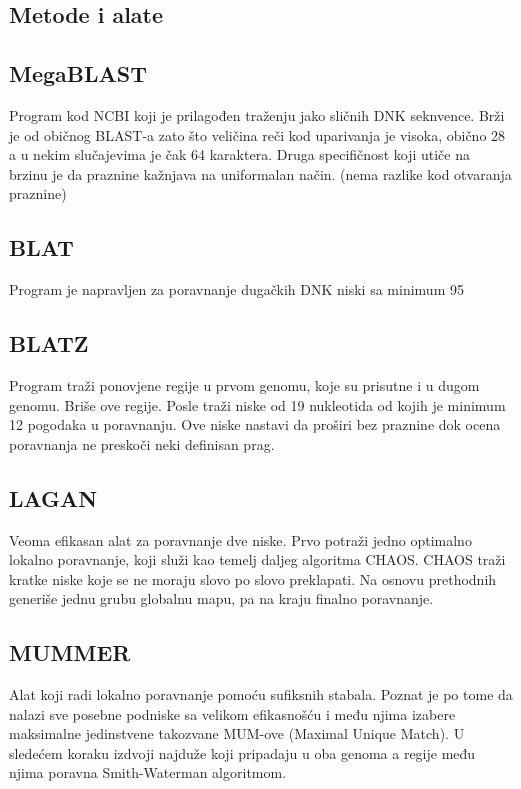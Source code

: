\subsection{Metode i alate}

\subsection{MegaBLAST}
Program kod NCBI koji je prilagođen traženju jako sličnih DNK seknvence. Brži je od običnog BLAST-a zato što veličina reči kod uparivanja je visoka, obično 28 a u nekim slučajevima je čak 64 karaktera. Druga specifičnost koji utiče na brzinu je da praznine kažnjava na uniformalan način. (nema razlike kod otvaranja praznine)

\subsection{BLAT}
Program je napravljen za poravnanje dugačkih DNK niski sa minimum 95%

\subsection{BLATZ}
Program traži ponovjene regije u prvom genomu, koje su prisutne i u dugom genomu. Briše ove regije. Posle traži niske od 19 nukleotida od kojih je minimum 12 pogodaka u poravnanju. Ove niske nastavi da proširi bez praznine dok ocena poravnanja ne preskoči neki definisan prag.

\subsection{LAGAN}
Veoma efikasan alat za poravnanje dve niske. Prvo potraži jedno optimalno lokalno poravnanje, koji služi kao temelj daljeg algoritma CHAOS. CHAOS traži kratke niske koje se ne moraju slovo po slovo preklapati. Na osnovu prethodnih generiše jednu grubu globalnu mapu, pa na kraju finalno poravnanje.

\subsection{MUMMER}
Alat koji radi lokalno poravnanje pomoću sufiksnih stabala. Poznat je po tome da nalazi sve posebne podniske sa velikom efikasnošću i među njima izabere maksimalne jedinstvene takozvane MUM-ove (Maximal Unique Match). U sledećem koraku izdvoji najduže koji pripadaju u oba genoma a regije među njima poravna Smith-Waterman algoritmom.

